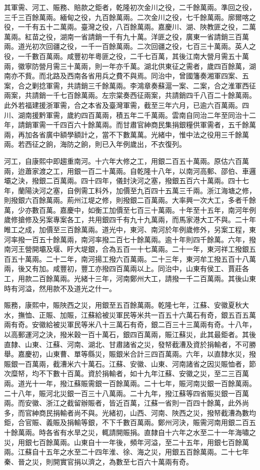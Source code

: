 \begin{pinyinscope}
其軍需、河工、賑務、賠款之鉅者，乾隆初次金川之役，二千餘萬兩。準回之役，三千三百餘萬兩。緬甸之役，九百餘萬兩。二次金川之役，七千餘萬兩。廓爾喀之役，一千有五十二萬兩。臺灣之役，八百餘萬兩。嘉慶川、湖、陜教匪之役，二萬萬兩。紅苗之役，湖南一省請銷一千有九十萬。洋匪之役，廣東一省請銷三百萬兩。道光初次回疆之役，一千一百餘萬兩。二次回疆之役，七百三十萬兩。英人之役，一千數百萬兩。咸豐初年粵匪之役，二千七百萬，其後江南大營月需五十萬兩，徽寧防營月需三十萬兩，則一年亦千萬。湖北供東征之需者，歲四百餘萬，湖南亦不貲。而北路及西南各省用兵之費不與焉。同治中，曾國籓奏湘軍四案、五案，合之剿捻軍需，共請銷三千餘萬兩。李鴻章奏蘇滬一案、二案，合之淮軍西征兩案，共請銷一千七百餘萬兩。左宗棠奏西征兩案，共請銷四千八百二十餘萬兩。此外若福建援浙軍需，合之本省及臺灣軍需，截至三年六月，已逾六百萬兩。四川、湖南援黔軍需，歲約四百萬兩，積五年二千萬兩。雲南自同治二年至同治十二年，請銷軍需一千四百六十餘萬兩。而甘肅官紳商民集捐銀糧供軍需者，五千餘萬兩，再加各省廣中額學額計之，當不下數萬萬。光緒中，惟中法之役用三千餘萬兩。若西征之餉，海防之餉，則已入年例歲出，不衣復列。

河工，自康熙中即趨重南河。十六年大修之工，用銀二百五十萬兩。原估六百萬兩，迨蕭家渡之工，用銀一百二十萬兩。自乾隆十八年，以南河高郵、邵伯、車邏壩之決，撥銀二百萬兩。四十四年，儀封決河之塞，撥銀五百六十萬兩。四十七年，蘭陽決河之塞，自例需工料外，加價至九百四十五萬三千兩。浙江海塘之修，則撥銀六百餘萬兩。荊州江堤之修，則撥銀二百萬兩。大率興一次大工，多者千餘萬，少亦數百萬。嘉慶中，如衡工加價至七百三十萬兩。十年至十五年，南河年例歲修搶修及另案專案各工，共用銀四千有九十九萬兩，而馬家港大工不與。二十年睢工之成，加價至三百餘萬兩。道光中，東河、南河於年例歲修外，另案工程，東河率撥一百五十餘萬兩，南河率撥二百七十餘萬兩。逾十年則四千餘萬。六年，撥南河王營開壩及堰、盱大堤銀，合為五百一十七萬兩。二十一年，東河祥工撥銀五百五十萬兩。二十二年，南河揚工撥六百萬兩。二十三年，東河牟工撥五百十八萬兩，後又有加。咸豐初，豐工亦撥四百萬兩以上。同治中，山東有侯工、賈莊各工，用款二百餘萬兩。光緒十三年，河南鄭州大工，請撥一千二百萬兩。其後山東時有河溢，然用款不及道光之什一。

賑務，康熙中，賑陜西之災，用銀至五百餘萬兩。乾隆七年，江蘇、安徽夏秋大水，撫恤、正賑、加賑，江蘇給被災軍民等米共一百五十六萬石有奇，銀五百五萬兩有奇。安徽給被災軍民等米八十三萬石有奇，銀二百三十三萬兩有奇。十八年，以高郵運河之決，撥米穀一百十萬石，銀四百萬兩，賑江蘇災，此其最鉅者。其後直隸、山東、江蘇、河南、湖北、甘肅諸省之災，發帑截漕及資於捐輸者，不可勝舉。嘉慶初，山東曹、單等縣災，賑銀米合計三四百萬兩。六年，以直隸水災，撥賑銀一百萬兩，截漕米六十萬石。江蘇、安徽、山東、河南諸省之因災賑恤者，節次糜帑，均不下數十百萬。資於捐輸者，如十九年江蘇、安徽之災，至二三百萬兩。道光十一年，撥江蘇賑需銀一百餘萬兩。二十七年，賑河南災銀一百餘萬兩。二十八年，賑河北災銀一百三十八萬兩。二十九年，撥江蘇等四省賑災銀一百萬兩。而安徽、浙江之截留辦賑者，皆近百萬，江蘇一省則一百四十餘萬，此外尚多，而官紳商民捐輸者尚不與。光緒初，山西、河南、陜西之災，撥帑截漕為數均鉅，合官賑、義賑及捐輸等銀，不下千數百萬兩。鄭州河決，賑需河南用銀二百五十餘萬兩。時各省有水旱之災，輒請開賑捐。直隸自十六年之水至二十一年海嘯之災，用銀七百餘萬兩。山東自十一年後，頻年河溢，至二十五年，用銀七百餘萬兩。江蘇自十五年之水至二十四年淮、徐、海之災，用銀五百餘萬兩。二十七年秦、晉之災，則開實官捐以濟之，為數至七百六十萬兩有奇。


\end{pinyinscope}
